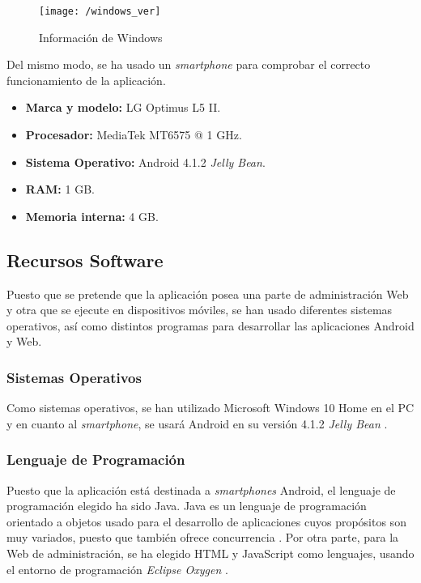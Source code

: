 \begin{figure}[!h]
	\begin{center}
		\texttt{[image: /windows\_ver]}
		\caption{Información de Windows}
		\label{fig:winver}
	\end{center}
\end{figure}

Del mismo modo, se ha usado un \textit{smartphone} para comprobar el correcto funcionamiento de la aplicación.

\begin{itemize}
	\item \textbf{Marca y modelo:} LG Optimus L5 II.
	\item \textbf{Procesador:} MediaTek MT6575 @ 1 \acs{GHz}.
	\item \textbf{Sistema Operativo:} Android 4.1.2 \textit{Jelly Bean}.
	\item \textbf{RAM:} 1 \acs{GB}.
	\item \textbf{Memoria interna:} 4 \acs{GB}.
\end{itemize}

\clearpage

\subsection{Recursos Software}
Puesto que se pretende que la aplicación posea una parte de administración Web y otra que se ejecute en dispositivos móviles, se han usado diferentes sistemas operativos, así como distintos programas para desarrollar las aplicaciones Android y Web.

\subsubsection*{Sistemas Operativos}
Como sistemas operativos, se han utilizado Microsoft Windows 10 Home \cite{Microsoft} en el PC y en cuanto al \textit{smartphone}, se usará Android en su versión 4.1.2 \textit{Jelly Bean} \cite{Andro}.

\subsubsection*{Lenguaje de Programación}
Puesto que la aplicación está destinada a \textit{smartphones} Android, el lenguaje de programación elegido ha sido Java. Java es un lenguaje de programación orientado a objetos usado para el desarrollo de aplicaciones cuyos propósitos son muy variados, puesto que también ofrece concurrencia \cite{Java}. Por otra parte, para la Web de administración, se ha elegido HTML y JavaScript como lenguajes, usando el entorno de programación \textit{Eclipse Oxygen} \cite{EclipseFoundation2018} .

